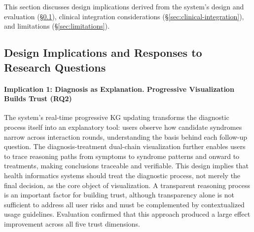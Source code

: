 
This section discusses design implications derived from the system's design and evaluation (\S\ref{sec:design-implications}), clinical integration considerations (\S\ref{sec:clinical-integration}), and limitations (\S\ref{sec:limitations}).

\subsection{Design Implications and Responses to Research Questions}\label{sec:design-implications}

\paragraph{Implication 1: Diagnosis as Explanation. Progressive Visualization Builds Trust (RQ2)}
The system's real-time progressive KG updating transforms the diagnostic process itself into an explanatory tool: users observe how candidate syndromes narrow across interaction rounds, understanding the basis behind each follow-up question. The diagnosis-treatment dual-chain visualization further enables users to trace reasoning paths from symptoms to syndrome patterns and onward to treatments, making conclusions traceable and verifiable. This design implies that health informatics systems should treat the diagnostic process, not merely the final decision, as the core object of visualization\cite{24,35}. A transparent reasoning process is an important factor for building trust\cite{40}, although transparency alone is not sufficient to address all user risks and must be complemented by contextualized usage guidelines\cite{41}. Evaluation confirmed that this approach produced a large effect improvement across all five trust dimensions.

